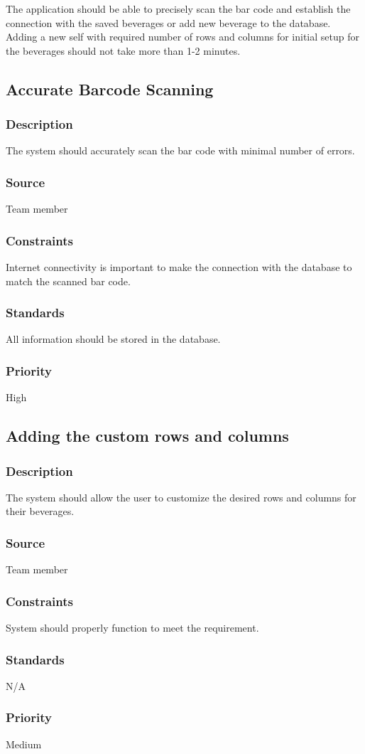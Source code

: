 The application should be able to precisely scan the bar code and establish the connection with the saved beverages or add new beverage to the database. Adding a new self with required number of rows and columns for initial setup for the beverages should not take more than 1-2 minutes. 

\subsection{Accurate Barcode Scanning}
\subsubsection{Description}
The system should accurately scan the bar code with minimal number of errors.
\subsubsection{Source}
Team member
\subsubsection{Constraints}
Internet connectivity is important to make the connection with the database to match the scanned bar code. 
\subsubsection{Standards}
All information should be stored in the database. 
\subsubsection{Priority}
High

\subsection{Adding the custom rows and columns }
\subsubsection{Description}
The system should allow the user to customize the desired rows and columns for their beverages. 
\subsubsection{Source}
Team member
\subsubsection{Constraints}
System should properly function to meet the requirement. 
\subsubsection{Standards}
N/A
\subsubsection{Priority}
Medium